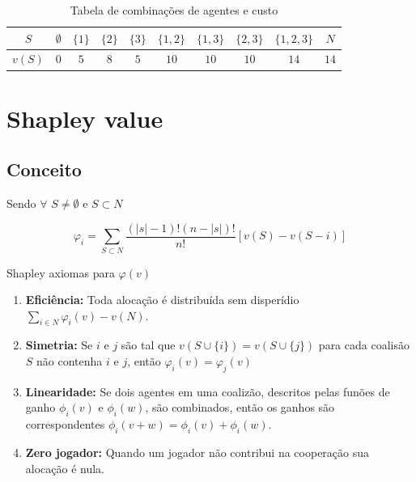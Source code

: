 \documentclass[
	article,			        %
	11pt,				          %
	oneside,			        %
	a4paper,			        %
	english,			        %
	brazil,				        %
	sumario=tradicional
]{abntex2}\usepackage[]{graphicx}\usepackage[]{color}
\begin{document}
\begin{table}[!h]
  \centering
  \caption{Tabela de combinações de agentes e custo}
  \label{Tab1}
  \begin{tabular}{@{}cccccccccc@{}}
  \toprule
    $S$    & $\emptyset$ & $\{1\}$ & $\{2\}$ & $\{3\}$ & $\{1,2\}$ & $\{1,3\}$ & $\{2,3\}$ &     $\{1,2,3\}$ & $N$  \\ \midrule
    $v(S)$ & $0$         & $5$     & $8$     & $5$     & $10$      & $10$      & $10$      &     $14$        & $14$ \\ \bottomrule
  \end{tabular}
\end{table}

\section{Shapley value}

\subsection{Conceito}

Sendo $\forall$ $S \neq \emptyset$ e $S \subset N$

\begin{equation}
  \label{eq:shaVal}
  \varphi _{i} = \sum_{S \subset N} \frac{(|s| - 1)!(n - |s|)!}{n!}[v(S)-v(S - i)]
\end{equation}

Shapley axiomas para $\varphi(v)$
\begin{enumerate}
  \item \textbf{Eficiência:} Toda alocação é distribuída sem disperídio $\sum_{i \in N} \varphi_i(v) - v(N)$.
  \item \textbf{Simetria:} Se $i$ e $j$ são tal que $v(S \cup \{i\}) = v(S \cup \{j\})$ para cada coalisão $S$ não contenha $i$ e $j$, então $\varphi_i (v) = \varphi_j (v)$
  \item \textbf{Linearidade:} Se dois agentes em uma coalizão, descritos pelas funões de ganho $\phi_i(v)$ e $\phi_i(w)$, são combinados, então os ganhos são correspondentes $\phi_i(v + w) = \phi_i(v) + \phi_i(w)$.
  \item \textbf{Zero jogador:} Quando um jogador não contribui na cooperação sua alocação é nula.
\end{enumerate}
\end{document}
